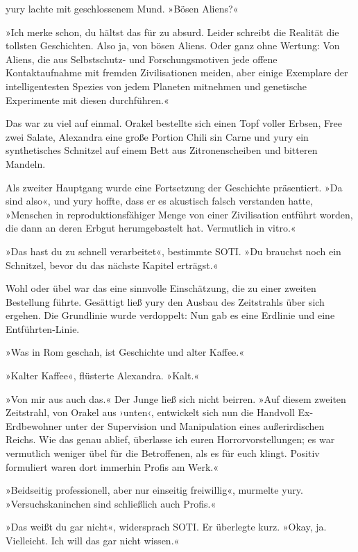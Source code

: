 yury lachte mit geschlossenem Mund.  »Bösen Aliens?«

»Ich merke schon, du hältst das für zu absurd. Leider schreibt die Realität die tollsten Geschichten. Also ja, von bösen Aliens. Oder ganz ohne Wertung: Von Aliens, die aus Selbstschutz- und Forschungsmotiven jede offene Kontaktaufnahme mit fremden Zivilisationen meiden, aber einige Exemplare der intelligentesten Spezies von jedem Planeten mitnehmen und genetische Experimente mit diesen durchführen.«

Das war zu viel auf einmal. Orakel bestellte sich einen Topf voller Erbsen, Free zwei Salate, Alexandra eine große Portion Chili sin Carne und yury ein synthetisches Schnitzel auf einem Bett aus Zitronenscheiben und bitteren Mandeln.

Als zweiter Hauptgang wurde eine Fortsetzung der Geschichte präsentiert. »Da sind also«, und yury hoffte, dass er es akustisch falsch verstanden hatte, »Menschen in reproduktionsfähiger Menge von einer Zivilisation entführt worden, die dann an deren Erbgut herumgebastelt hat. Vermutlich in vitro.«

»Das hast du zu schnell verarbeitet«, bestimmte SOTI. »Du brauchst noch ein Schnitzel, bevor du das nächste Kapitel erträgst.«

Wohl oder übel war das eine sinnvolle Einschätzung, die zu einer zweiten Bestellung führte. Gesättigt ließ yury den Ausbau des Zeitstrahls über sich ergehen. Die Grundlinie wurde verdoppelt: Nun gab es eine Erdlinie und eine Entführten-Linie.

»Was in Rom geschah, ist Geschichte und alter Kaffee.«

»Kalter Kaffee«, flüsterte Alexandra. »Kalt.«

»Von mir aus auch das.« Der Junge ließ sich nicht beirren. »Auf diesem zweiten Zeitstrahl, von Orakel aus ›unten‹, entwickelt sich nun die Handvoll Ex-Erdbewohner unter der Supervision und Manipulation eines außerirdischen Reichs. Wie das genau ablief, überlasse ich euren Horrorvorstellungen; es war vermutlich weniger übel für die Betroffenen, als es für euch klingt. Positiv formuliert waren dort immerhin Profis am Werk.«

»Beidseitig professionell, aber nur einseitig freiwillig«, murmelte yury. »Versuchskaninchen sind schließlich auch Profis.«

»Das weißt du gar nicht«, widersprach SOTI. Er überlegte kurz. »Okay, ja. Vielleicht. Ich will das gar nicht wissen.«

